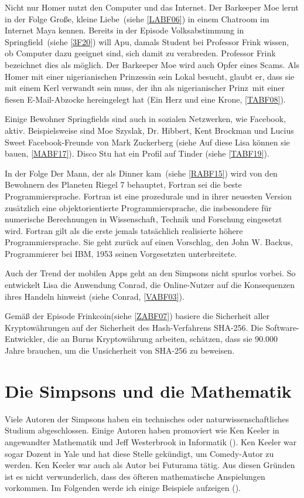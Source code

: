 \begin{appendix}
Nicht nur Homer nutzt den Computer und das Internet. Der Barkeeper Moe lernt in der Folge \glqq Große, kleine Liebe\grqq\ (siehe \ref{LABF06}) in einem Chatroom im Internet Maya kennen. Bereits in der Episode \glqq Volksabstimmung in Springfield\grqq\ (siehe \ref{3F20}) will Apu, damals Student bei Professor Frink wissen, ob Computer dazu geeignet sind, sich damit zu verabreden. Professor Frink bezeichnet dies als möglich. Der Barkeeper Moe wird auch Opfer eines Scams. Als Homer mit einer nigerianischen Prinzessin sein Lokal besucht, glaubt er, dass sie mit einem Kerl verwandt sein muss, der ihn als \glqq nigerianischer Prinz\grqq\ mit einer fiesen E-Mail-Abzocke hereingelegt hat (\glqq Ein Herz und eine Krone\grqq, \ref{TABF08}).

Einige Bewohner Springfields sind auch in sozialen Netzwerken, wie Facebook, aktiv. Beispielsweise sind Moe Szyslak, Dr. Hibbert, Kent Brockman und Lucius Sweet Facebook-Freunde von Mark Zuckerberg (siehe \glqq Auf diese Lisa können sie bauen\grqq , \ref{MABF17}). Disco Stu hat ein Profil auf Tinder (siehe \ref{TABF19}).

In der Folge \glqq Der Mann, der als Dinner kam\grqq\ (siehe \ref{RABF15}) wird von den Bewohnern des Planeten Riegel 7 behauptet, Fortran sei die beste Programmiersprache. Fortran ist eine prozedurale und in ihrer neuesten Version zusätzlich eine objektorientierte Programmiersprache, die insbesondere für numerische Berechnungen in Wissenschaft, Technik und Forschung eingesetzt wird. Fortran gilt als die erste jemals tatsächlich realisierte höhere Programmiersprache. Sie geht zurück auf einen Vorschlag, den John W. Backus, Programmierer bei IBM, 1953 seinen Vorgesetzten unterbreitete.

Auch der Trend der mobilen Apps geht an den Simpsons nicht spurlos vorbei. So entwickelt Lisa die Anwendung Conrad, die Online-Nutzer auf die Konsequenzen ihres Handeln hinweist (siehe \glqq Conrad\grqq , \ref{VABF03}).

Gemäß der Episode \glqq Frinkcoin\grqq (siehe \ref{ZABF07}) basiere die Sicherheit aller Kryptowährungen auf der Sicherheit des Hash-Verfahrens SHA-256. Die Software-Entwickler, die an Burns Kryptowährung arbeiten, schätzen, dass sie 90.000 Jahre brauchen, um die Unsicherheit von SHA-256 zu beweisen.

\section{Die Simpsons und die Mathematik}\label{SimpsonsMathematik}
Viele Autoren der Simpsons haben ein technisches oder naturwissenschaftliches Studium abgeschlossen. Einige Autoren haben promoviert wie Ken Keeler in angewandter Mathematik und Jeff Westerbrook in Informatik (\cite{Singh}). Ken Keeler war sogar Dozent in Yale und hat diese Stelle gekündigt, um Comedy-Autor zu werden. Ken Keeler war auch als Autor bei Futurama tätig. Aus diesen Gründen ist es nicht verwunderlich, dass des öfteren mathematische Anspielungen vorkommen. Im Folgenden werde ich einige Beispiele aufzeigen (\cite{ZeitSingh}).


\end{appendix}
